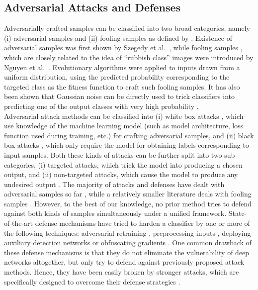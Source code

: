 \documentclass[letterpaper]{article} %
\begin{document}
\subsection{Adversarial Attacks and Defenses}
Adversarially crafted samples can be classified into two broad categories, namely (i) adversarial samples  and (ii) fooling samples as defined by . Existence of adversarial samples was first shown by Szegedy et al.~, while fooling samples , which are closely related to the idea of ``rubbish class'' images  were introduced by Nguyen et al.~. Evolutionary algorithms were applied to inputs drawn from a uniform distribution, using the predicted probability corresponding to the targeted class as the fitness function  to craft such fooling samples. It has also been shown that Gaussian noise can be directly used to trick classifiers into predicting one of the output classes with very high probability .\\
\indent Adversarial attack methods can be classified into (i) white box attacks , which use knowledge of the machine learning model (such as model architecture, loss function used during training, etc.) for crafting adversarial samples, and (ii) black box attacks , which only require the model for obtaining labels corresponding to input samples. Both these kinds of attacks can be further split into two sub categories, (i) targeted attacks, which trick the model into producing a chosen output, and (ii) non-targeted attacks, which cause the model to produce any undesired output . The majority of attacks and defenses have dealt with adversarial samples so far , while a relatively smaller literature deals with fooling samples . However, to the best of our knowledge, no prior method tries to defend against both kinds of samples simultaneously under a unified framework. State-of-the-art defense mechanisms have tried to harden a classifier by one or more of the following techniques: adversarial retraining , preprocessing inputs , deploying auxiliary detection networks  or obfuscating gradients . One common drawback of these defense mechanisms is that they do not eliminate the vulnerability of deep networks altogether, but only try to defend against previously proposed attack methods. Hence, they have been easily broken by stronger attacks, which are specifically designed to overcome their defense strategies . 
\end{document}

